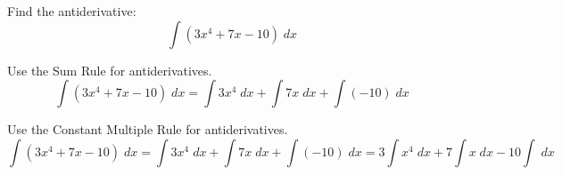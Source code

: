 \documentclass{ximera}
\author{Emma Smith Zbarsky\and Nela Lakos}
\begin{document}
\begin{exercise}

Find the antiderivative: \[\int (3x^4+7x-10)\; dx\]




\begin{hint}
Use the Sum Rule for antiderivatives.
\[\int (3x^4+7x-10)\; dx=\int 3x^4\; dx+\int7x\; dx+\int(-10)\; dx\]
\end{hint}
\begin{hint}
Use the Constant Multiple Rule for antiderivatives.
\[\int (3x^4+7x-10)\; dx=\int 3x^4\; dx+\int7x\; dx+\int(-10)\; dx=3\int x^4\; dx+7\int x\; dx-10\int \; dx\]
\end{hint}


\begin{multipleChoice}
\end{multipleChoice}

\end{exercise}
\end{document}

